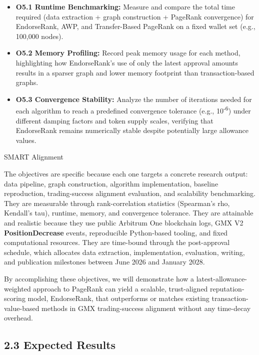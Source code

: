 \begin{itemize}
\item[\textbullet] \textbf{O5.1 Runtime Benchmarking: }Measure and compare the total time required (data extraction + graph construction + PageRank convergence) for EndorseRank, AWP, and Transfer-Based PageRank on a fixed wallet set (e.g., 100,000 nodes).
\item[\textbullet] \textbf{O5.2 Memory Profiling: }Record peak memory usage for each method, highlighting how EndorseRank's use of only the latest approval amounts results in a sparser graph and lower memory footprint than transaction-based graphs.
\item[\textbullet] \textbf{O5.3 Convergence Stability}\textbf{: }Analyze the number of iterations needed for each algorithm to reach a predefined convergence tolerance (e.g., 10\textsuperscript{-}\textsuperscript{6}) under different damping factors and token supply scales, verifying that EndorseRank remains numerically stable despite potentially large allowance values.
\end{itemize}
SMART Alignment


The objectives are specific because each one targets a concrete research output: data pipeline, graph construction, algorithm implementation, baseline reproduction, trading-success alignment evaluation, and scalability benchmarking. They are measurable through rank-correlation statistics (Spearman's rho, Kendall's tau), runtime, memory, and convergence tolerance. They are attainable and realistic because they use public Arbitrum One blockchain logs, GMX V2 \textbf{PositionDecrease} events, reproducible Python-based tooling, and fixed computational resources. They are time-bound through the post-approval schedule, which allocates data extraction, implementation, evaluation, writing, and publication milestones between June 2026 and January 2028.


By accomplishing these objectives, we will demonstrate how a latest-allowance-weighted approach to PageRank can yield a scalable, trust-aligned reputation-scoring model, EndorseRank, that outperforms or matches existing transaction-value-based methods in GMX trading-success alignment without any time-decay overhead.


\subsection*{2.3 Expected Results}
\label{sec:expected-results}

